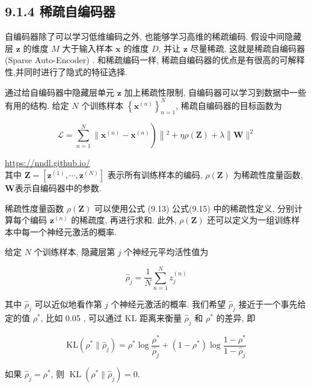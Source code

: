 \documentclass[10pt]{article}
\begin{document}
\subsection*{9.1.4 稀疏自编码器}
自编码器除了可以学习低维编码之外, 也能够学习高维的稀疏编码. 假设中间隐藏层 $\boldsymbol{z}$ 的维度 $M$ 大于输入样本 $\boldsymbol{x}$ 的维度 $D$, 并让 $\boldsymbol{z}$ 尽量稀疏, 这就是稀疏自编码器 (Sparse Auto-Encoder) . 和稀疏编码一样, 稀疏自编码器的优点是有很高的可解释性,并同时进行了隐式的特征选择.

通过给自编码器中隐藏层单元 $\boldsymbol{z}$ 加上稀疏性限制, 自编码器可以学习到数据中一些有用的结构. 给定 $N$ 个训练样本 $\left\{\boldsymbol{x}^{(n)}\right\}_{n=1}^{N}$, 稀疏自编码器的目标函数为


\begin{equation*}
\left.\mathcal{L}=\sum_{n=1}^{N} \| \boldsymbol{x}^{(n)}-\boldsymbol{x}^{(n)}\right)\left\|^{2}+\eta \rho(\boldsymbol{Z})+\lambda\right\| \boldsymbol{W} \|^{2} \tag{9.23}
\end{equation*}


\href{https://nndl.github.io/}{https://nndl.github.io/}\\
其中 $\boldsymbol{Z}=\left[\boldsymbol{z}^{(1)}, \cdots, \boldsymbol{z}^{(N)}\right]$ 表示所有训练样本的编码, $\rho(\boldsymbol{Z})$ 为稀疏性度量函数, $\boldsymbol{W}$表示自编码器中的参数.

稀疏性度量函数 $\rho(\boldsymbol{Z})$ 可以使用公式 (9.13) 公式(9.15) 中的稀疏性定义, 分别计算每个编码 $\boldsymbol{z}^{(n)}$ 的稀疏度, 再进行求和. 此外, $\rho(\boldsymbol{Z})$ 还可以定义为一组训练样本中每一个神经元激活的概率.

给定 $N$ 个训练样本, 隐藏层第 $j$ 个神经元平均活性值为


\begin{equation*}
\hat{\rho}_{j}=\frac{1}{N} \sum_{n=1}^{N} z_{j}^{(n)} \tag{9.24}
\end{equation*}


其中 $\hat{\rho}_{j}$ 可以近似地看作第 $j$ 个神经元激活的概率. 我们希望 $\hat{\rho}_{j}$ 接近于一个事先给定的值 $\rho^{*}$, 比如 0.05 , 可以通过 $\mathrm{KL}$ 距离来衡量 $\hat{\rho}_{j}$ 和 $\rho^{*}$ 的差异, 即


\begin{equation*}
\mathrm{KL}\left(\rho^{*} \| \hat{\rho}_{j}\right)=\rho^{*} \log \frac{\rho^{*}}{\hat{\rho}_{j}}+\left(1-\rho^{*}\right) \log \frac{1-\rho^{*}}{1-\hat{\rho}_{j}} \tag{9.25}
\end{equation*}


如果 $\hat{\rho}_{j}=\rho^{*}$, 则 $\operatorname{KL}\left(\rho^{*} \| \hat{\rho}_{j}\right)=0$.
\end{document}
